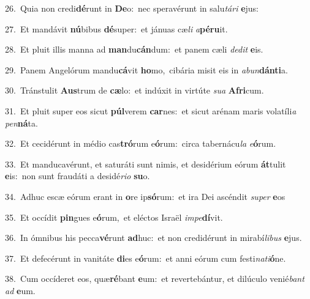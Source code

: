 {\numbfont\textcolor{\numbcolor}{26.}}~Quia non credi\-\textbf{dé}\-runt in \textbf{De}\-o:~\star nec speravérunt in salu\-\textit{tá}\-\textit{ri} \textbf{e}\-jus:\par
{\numbfont\textcolor{\numbcolor}{27.}}~Et mandávit \textbf{nú}\-bibus \textbf{dé}\-super:~\star et jánuas cæ\textit{li} \textit{a}\-\textbf{pé}\textbf{ru}it.\par
{\numbfont\textcolor{\numbcolor}{28.}}~Et pluit illis manna ad \textbf{man}\-du\-\textbf{cán}\-dum:~\star et panem cæli \textit{de}\-\textit{dit} \textbf{e}\-is.\par
{\numbfont\textcolor{\numbcolor}{29.}}~Panem Angelórum mandu\-\textbf{cá}\-vit \textbf{ho}\-mo,~\star cibária misit eis in \textit{ab}\-\textit{un}\textbf{dán}\textbf{ti}a.\par
{\numbfont\textcolor{\numbcolor}{30.}}~Tránstulit \textbf{Aus}\-trum de \textbf{cæ}\-lo:~\star et indúxit in virtúte \textit{su}\-\textit{a} \textbf{A}\-\textbf{fri}cum.\par
{\numbfont\textcolor{\numbcolor}{31.}}~Et pluit super eos sicut \textbf{púl}\-verem \textbf{car}\-nes:~\star et sicut arénam maris volatíli\textit{a} \textit{pen}\-\textbf{ná}ta.\par
{\numbfont\textcolor{\numbcolor}{32.}}~Et cecidérunt in médio cas\-\textbf{tró}\-rum e\-\textbf{ó}\-rum:~\star circa tabernácu\textit{la} \textit{e}\-\textbf{ó}rum.\par
{\numbfont\textcolor{\numbcolor}{33.}}~Et manducavérunt, et saturáti sunt nimis, et desidérium eórum \textbf{át}\-tulit \textbf{e}\-is:~\star non sunt fraudáti a desidé\-\textit{ri}\-\textit{o} \textbf{su}\-o.\par
{\numbfont\textcolor{\numbcolor}{34.}}~Adhuc escæ eórum erant in \textbf{o}\-re ip\-\textbf{só}\-rum:~\star et ira Dei ascéndit \textit{su}\-\textit{per} \textbf{e}\-os\par
{\numbfont\textcolor{\numbcolor}{35.}}~Et occídit \textbf{pin}\-gues e\-\textbf{ó}\-rum,~\star et eléctos Israël \textit{im}\-\textit{pe}\textbf{dí}vit.\par
{\numbfont\textcolor{\numbcolor}{36.}}~In ómnibus his pecca\-\textbf{vé}\-runt \textbf{ad}\-huc:~\star et non credidérunt in mirabí\-\textit{li}\-\textit{bus} \textbf{e}\-jus.\par
{\numbfont\textcolor{\numbcolor}{37.}}~Et defecérunt in vanitáte \textbf{di}\-es e\-\textbf{ó}\-rum:~\star et anni eórum cum festi\-\textit{na}\-\textit{ti}\textbf{ó}ne.\par
{\numbfont\textcolor{\numbcolor}{38.}}~Cum occíderet eos, quæ\-\textbf{ré}\-bant \textbf{e}\-um:~\star et revertebántur, et dilúculo venié\textit{bant} \textit{ad} \textbf{e}\-um.\par

